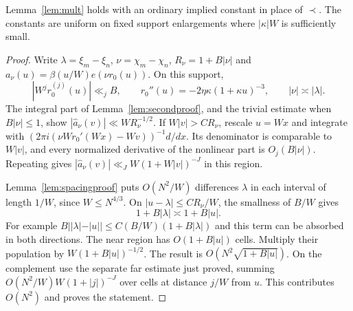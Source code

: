 \begin{proposition}\label{prop:multproof}
Lemma~\ref{lem:mult} holds with an ordinary implied constant in place of
$\prec$. The constants are uniform on fixed support enlargements where
$|\kappa|W$ is sufficiently small.
\end{proposition}
\begin{proof}
Write $\lambda=\xi_m-\xi_n$, $\nu=\chi_m-\chi_n$,
$R_\nu=1+B|\nu|$ and $a_\nu(u)=\beta(u/W)e(\nu r_0(u))$.
On this support,
\[
 |W^j r_0^{(j)}(u)|\ll_j B,\qquad
 r_0''(u)=-2\eta\kappa(1+\kappa u)^{-3},\qquad
 |\nu|\asymp|\lambda|.
\]
The integral part of Lemma~\ref{lem:secondproof}, and the trivial estimate
when $B|\nu|\le1$, show $|\widehat a_\nu(v)|\ll WR_\nu^{-1/2}$.
If $W|v|>C R_\nu$, rescale $u=Wx$ and integrate with
$(2\pi i(\nu W r_0'(Wx)-Wv))^{-1}d/dx$. Its denominator is comparable
to $W|v|$, and every normalized derivative of the nonlinear part is
$O_j(B|\nu|)$. Repeating gives
$|\widehat a_\nu(v)|\ll_J W(1+W|v|)^{-J}$ in this region.

Lemma~\ref{lem:spacingproof} puts $O(N^2/W)$ differences $\lambda$ in
each interval of length $1/W$, since $W\le N^{4/3}$.
On $|u-\lambda|\le CR_\nu/W$, the smallness of $B/W$ gives
\[
 1+B|\lambda|\asymp1+B|u|.
\]
For example $B||\lambda|-|u||\le C(B/W)(1+B|\lambda|)$ and this term
can be absorbed in both directions. The near region has
$O(1+B|u|)$ cells. Multiply their population by
$W(1+B|u|)^{-1/2}$. The result is $O(N^2\sqrt{1+B|u|})$.
On the complement use the separate far estimate just proved, summing
$O(N^2/W)W(1+|j|)^{-J}$ over cells at distance $j/W$ from $u$.
This contributes $O(N^2)$ and proves the statement.
\end{proof}

